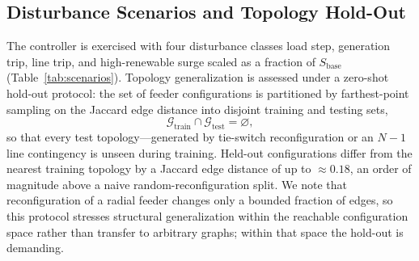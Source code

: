 \documentclass[lettersize,journal]{IEEEtran}
\begin{document}
\begin{table}[!t]
\caption{Frequency-security thresholds and the cited standard
defining each value.}
\label{tab:fsec_standards}
\centering
\footnotesize
{}
\end{table}
\subsection{Disturbance Scenarios and Topology Hold-Out}
\label{sec:casestudy:scenarios}

The controller is exercised with four disturbance classes load step, generation trip, line trip, and high-renewable surge scaled as a fraction of $S_{\mathrm{base}}$ (Table~\ref{tab:scenarios}). Topology generalization is assessed under a zero-shot hold-out protocol: the set of feeder configurations is partitioned by farthest-point sampling on the Jaccard edge distance into disjoint training and testing sets,
\begin{equation}
  \mathcal{G}_{\mathrm{train}}\cap\mathcal{G}_{\mathrm{test}}=\varnothing,
  \label{eq:holdout}
\end{equation}
so that every test topology---generated by tie-switch reconfiguration or an $N{-}1$ line contingency is unseen during training. Held-out configurations differ from the nearest training topology by a Jaccard edge distance of up to $\approx\!0.18$, an order of magnitude above a naive random-reconfiguration split. We note that reconfiguration of a radial feeder changes only a bounded fraction of edges, so this protocol stresses structural generalization within the reachable configuration space rather than transfer to arbitrary graphs; within that space the hold-out is demanding.
\end{document}
